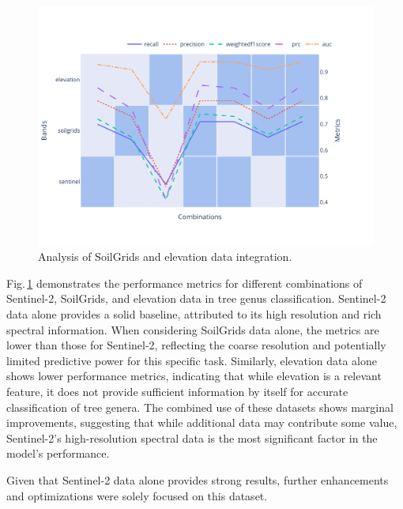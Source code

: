 \begin{figure}[ht]
    \centering
    \includegraphics[width=0.9\linewidth, trim={20pt 40pt 10pt 30pt}, clip]{figures/figures_analysis/soil_elevation_analysis.pdf}
    \caption{Analysis of SoilGrids and elevation data integration.}
    \label{fig:soil_elevation_analysis}
\end{figure}

Fig.\,\ref{fig:soil_elevation_analysis} demonstrates the performance metrics for different combinations of Sentinel-2, SoilGrids, and elevation data in tree genus classification. Sentinel-2 data alone provides a solid baseline, attributed to its high resolution and rich spectral information. When considering SoilGrids data alone, the metrics are lower than those for Sentinel-2, reflecting the coarse resolution and potentially limited predictive power for this specific task. Similarly, elevation data alone shows lower performance metrics, indicating that while elevation is a relevant feature, it does not provide sufficient information by itself for accurate classification of tree genera. The combined use of these datasets shows marginal improvements, suggesting that while additional data may contribute some value, Sentinel-2's high-resolution spectral data is the most significant factor in the model's performance.

Given that Sentinel-2 data alone provides strong results, further enhancements and optimizations were solely focused on this dataset. 